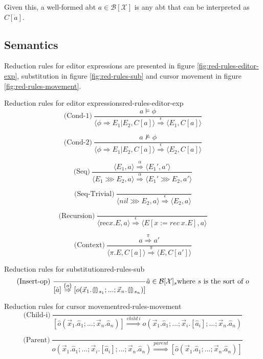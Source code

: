 \documentclass{article}
\newcommand{\cleftsemicirc}{\put(3.5,2.5){\oval(3,8)[l]}\put(4,-1.3){\line(0,1){8}}\phantom{\circ}}
\newcommand{\crightsemicirc}{\put(1.5,2.5){\oval(3,8)[r]}\put(1,-1.3){\line(0,1){8}}\phantom{\circ}}
\newcommand{\hole}{\cleftsemicirc \crightsemicirc}
\begin{document}
Given this, a well-formed abt $a \in \mathcal{B[\mathcal{X}]}$ is any abt that can be interpreted as $C[\dot{a}]$.

\subsection{Semantics}
Reduction rules for editor expressions are presented in figure \ref{fig:red-rules-editor-exp}, substitution in figure \ref{fig:red-rules-sub} and cursor movement in figure \ref{fig:red-rules-movement}.



\begin{myfigure}{Reduction rules for editor expressions}{red-rules-editor-exp}
\[
\text{(Cond-1)} \ \frac{a \models \phi}{\langle \phi \Rightarrow E_1|E_2, C[a] \rangle \stackrel{\epsilon}{\Rightarrow} \langle E_1, C[a] \rangle}
\]

\[
\text{(Cond-2)} \ \frac{a \not\models \phi}{\langle \phi \Rightarrow E_1|E_2, C[a] \rangle \stackrel{\epsilon}{\Rightarrow} \langle E_2, C[a] \rangle}
\]

\[
\text{(Seq)} \ \frac{\langle E_1,a \rangle \stackrel{\alpha}{\Rightarrow} \langle E_1',a' \rangle}{\langle E_1 \ggg E_2,a \rangle \stackrel{\alpha}{\Rightarrow} \langle E_1' \ggg E_2,a' \rangle}
\]

\[
\text{(Seq-Trivial)} \ \frac{}{\langle nil \ggg E_2,a \rangle \stackrel{\epsilon}{\Rightarrow} \langle E_2, a \rangle}
\]

\[
\text{(Recursion)} \ \frac{}{\langle \text{rec} x.E,a \rangle \stackrel{\epsilon}{\Rightarrow} \langle E[x:= rec \ x.E],a \rangle}
\]

\[
\text{(Context)} \ \frac{a \stackrel{\pi}{\Rightarrow} a'}{\langle \pi.E,C[a] \rangle \stackrel{\pi}{\Rightarrow} \langle E,C[a'] \rangle}
\]
\end{myfigure}

\begin{myfigure}{Reduction rules for substitution}{red-rules-sub}
\[
\text{(Insert-op)} \ \frac{}{[\hat{a}] \stackrel{\{ o \}}{\Rightarrow} [o(\vec{x}_1.\hole_{s_1};...;\vec{x}_n.\hole_{s_n})]} \hat{a} \in \mathcal{B}[\mathcal{X}]_s \text{where } s \text{ is the sort of } o
\]
\end{myfigure}

\begin{myfigure}{Reduction rules for cursor movement}{red-rules-movement}
\[
\text{(Child-i)} \ \frac{}{[\hat{o}(\vec{x}_1.\hat{a}_1;...;\vec{x}_n.\hat{a}_n)] \stackrel{child \ i}{\Rightarrow} o(\vec{x}_1.\hat{a}_1;...;\vec{x}_i.[\hat{a}_i];...;\vec{x}_n.\hat{a}_n)}
\]

\[
\text{(Parent)} \ \frac{}{o(\vec{x}_1.\hat{a}_1;...;\vec{x}_i.[\hat{a}_i];...;\vec{x}_n.\hat{a}_n) \stackrel{parent}{\Rightarrow} [\hat{o}(\vec{x}_1.\hat{a}_1;...;\vec{x}_n.\hat{a}_n)]}
\]
\end{myfigure}
\end{document}
